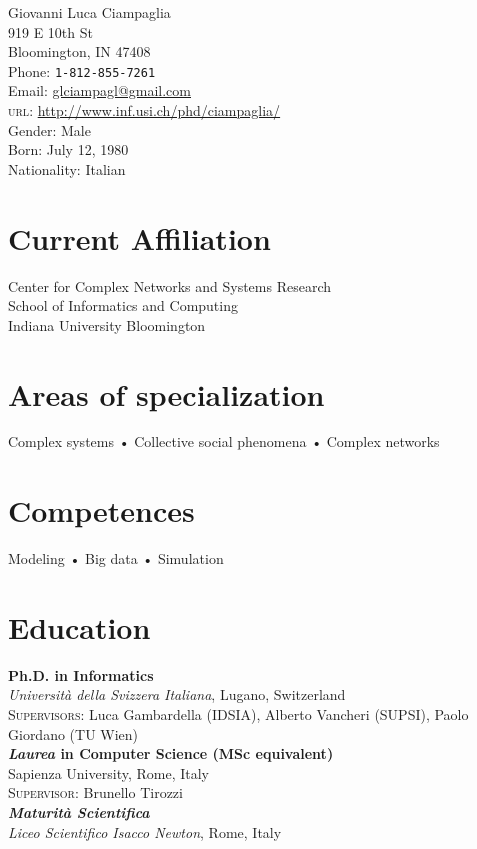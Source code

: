 \documentclass[10pt, letterpaper]{article}
\newcommand{\years}[1]{\marginnote{\small #1}}
\begin{document}
{\LARGE Giovanni Luca Ciampaglia}\\[1cm]
919 E 10th St \\
Bloomington, IN 47408\\[.2cm]
Phone: \texttt{1-812-855-7261}\\
Email: \href{mailto:gciampag@indiana.edu}{glciampagl@gmail.com}\\
\textsc{url}: \href{http://www.inf.usi.ch/phd/ciampaglia/}{http://www.inf.usi.ch/phd/ciampaglia/}\\[.2cm]
Gender: Male\\
Born:  July 12, 1980\\
Nationality: Italian

\section*{Current Affiliation}

Center for Complex Networks and Systems Research\\
School of Informatics and Computing\\
Indiana University Bloomington

\section*{Areas of specialization}
Complex systems • Collective social phenomena • Complex networks

\section*{Competences}
Modeling • Big data • Simulation

\section*{Education}
\noindent
\years{2012}\textbf{Ph.D. in Informatics}\\
\textsl{Università della Svizzera Italiana}, Lugano, Switzerland\\
\textsc{Supervisors}: Luca Gambardella (IDSIA), Alberto Vancheri (SUPSI), Paolo
Giordano (TU Wien)\\[1em]
\years{2006}\textbf{\textsl{Laurea} in Computer Science (MSc equivalent)}\\ Sapienza University, Rome, Italy\\
\textsc{Supervisor}: Brunello Tirozzi \\[1em]
\years{1999}\textbf{\textsl{Maturità Scientifica}}\\
\textsl{Liceo Scientifico Isacco Newton}, Rome, Italy\\
\end{document}
